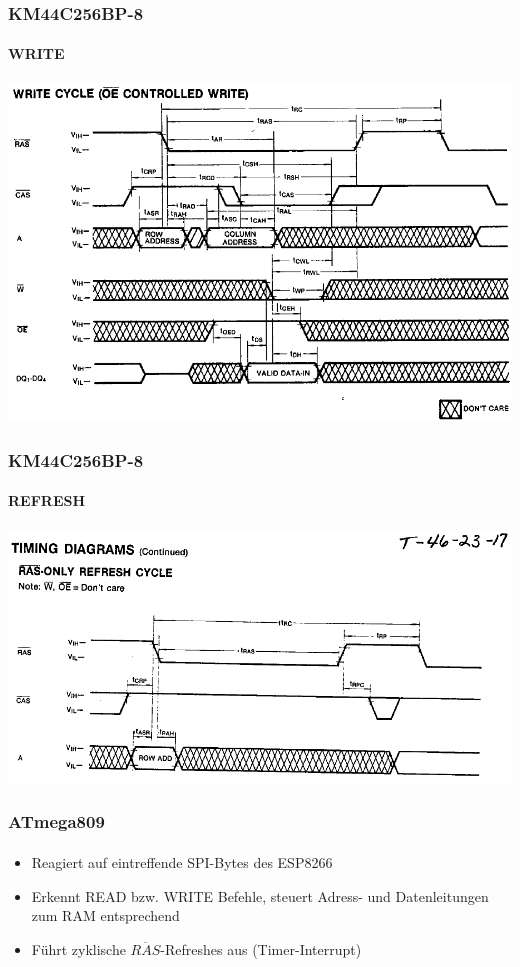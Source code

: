 \documentclass{beamer}
\begin{document}
\begin{frame}

	\frametitle{KM44C256BP-8}
	\framesubtitle{WRITE}
	\begin{center}
		\includegraphics[scale=0.35]{images/DRAM_Write_Cycle.png}
	\end{center}
	
\end{frame}

\begin{frame}

	\frametitle{KM44C256BP-8}
	\framesubtitle{REFRESH}
	\begin{center}
		\includegraphics[scale=0.35]{images/DRAM_Refresh_Cycle.png}
	\end{center}
	
\end{frame}

\begin{frame}

	\frametitle{ATmega809}
	\framesubtitle{}
	\begin{itemize}
		\item Reagiert auf eintreffende SPI-Bytes des ESP8266
		\item Erkennt READ bzw. WRITE Befehle, steuert Adress- und Datenleitungen zum RAM entsprechend
		\item Führt zyklische $\overline{RAS}$-Refreshes aus (Timer-Interrupt)
	\end{itemize}
	
\end{frame}
\end{document}
